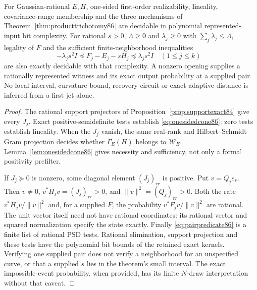 \begin{proposition}
\label{prop:coneexact86}
For Gaussian-rational $E,H$, one-sided first-order realizability,
lineality, covariance-range membership and the three mechanisms of
Theorem~\ref{thm:producttrichotomy86} are decidable in polynomial
represented-input bit complexity.  For rational $s>0$, $\Lambda\ge0$
and $\lambda_j\ge0$ with $\sum_j\lambda_j\le\Lambda$, legality of
$F$ and the sufficient finite-neighborhood inequalities
\begin{equation}\label{eq:pairpredicate86}
 -\lambda_js^2I\preceq F_j-E_j-sH_j\preceq\lambda_js^2I
 \quad(1\le j\le k)
\end{equation}
are also exactly decidable with that complexity.
A nonzero opening supplies a rationally represented witness and its
exact output probability at a supplied pair.  No local interval,
curvature bound, recovery circuit or exact adaptive distance is
inferred from a first jet alone.
\end{proposition}
\begin{proof}
The rational support projectors of
Proposition~\ref{prop:supportexact84} give every $J_j$.
Exact positive-semidefinite tests establish \eqref{eq:onesidedcone86};
zero tests establish lineality.  When the $J_j$ vanish, the same
real-rank and Hilbert--Schmidt Gram projection decides whether
$\Gamma_E(H)$ belongs to $\mathcal W_E$.
Lemma~\ref{lem:onesidedcone86} gives necessity and sufficiency,
not only a formal positivity prefilter.

If $J_j\succeq0$ is nonzero, some diagonal element $(J_j)_{rr}$ is
positive.  Put $v=Q_je_r$.  Then $v\ne0$,
$v^*H_jv=(J_j)_{rr}>0$, and $\|v\|^2=(Q_j)_{rr}>0$.
Both the rate $v^*H_jv/\|v\|^2$ and, for a supplied $F$,
the probability $v^*F_jv/\|v\|^2$ are rational.
The unit vector itself need not have rational coordinates: its
rational vector and squared normalization specify the state exactly.
Finally \eqref{eq:pairpredicate86} is a finite list of rational PSD
tests.  Rational elimination, support projection and these tests
have the polynomial bit bounds of the retained exact kernels.
Verifying one supplied pair does not verify a neighborhood for an
unspecified curve, or that a supplied $s$ lies in the theorem's
small interval.  The exact impossible-event probability, when
provided, has its finite $N$-draw interpretation without that caveat.
\end{proof}
